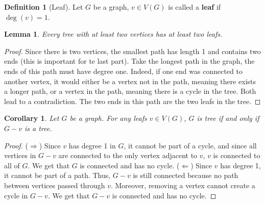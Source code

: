 \documentclass{tufte-handout}
\newtheorem{cor}[thm]{Corollary}
\newtheorem{lem}[thm]{Lemma}
\theoremstyle{definition}
\newtheorem{defn}[thm]{Definition}
\theoremstyle{remark}
\begin{document}
\begin{defn}[Leaf]
	Let $G$ be a graph, $v \in V(G)$ is called a \textbf{leaf} if $\deg{(v)} = 1$.
\end{defn}
\begin{lem}
	Every tree with at least two vertices has at least two leafs.
\end{lem}
\begin{proof}
	Since there is two vertices, the smallest path has length 1 and contains two ends (this is important for te last part). Take the longest path in the graph, the ends of this path must have degree one. Indeed, if one end was connected to another vertex, it would either be a vertex not in the path, meaning there exists a longer path, or a vertex in the path, meaning there is a cycle in the tree. Both lead to a contradiction. The two ends in this path are the two leafs in the tree.
\end{proof}
\begin{cor}
	Let $G$ be a graph. For any leafs $v \in V(G)$, $G$ is tree if and only if $G-v$ is a tree.
\end{cor}
\begin{proof}
	($\Rightarrow$) Since $v$ has degree 1 in $G$, it cannot be part of a cycle, and since all vertices in $G-v$ are connected to the only vertex adjacent to $v$, $v$ is connected to all of $G$. We get that $G$ is connected and has no cycle.
	($\Leftarrow$) Since $v$ has degree 1, it cannot be part of a path. Thus, $G-v$ is still connected because no path between vertices passed through $v$. Moreover, removing a vertex cannot create a cycle in $G-v$. We get that $G-v$ is connected and has no cycle.
\end{proof}
\end{document}
